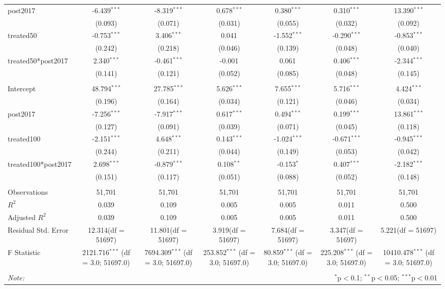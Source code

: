 \documentclass[12pt]{article}
\begin{document}
\begin{table}[!htbp]
\begin{tabular}{@{\extracolsep{5pt}}lcccccc}
 post2017 & -6.439$^{***}$ & -8.319$^{***}$ & 0.678$^{***}$ & 0.380$^{***}$ & 0.310$^{***}$ & 13.390$^{***}$ \\
  & (0.093) & (0.071) & (0.031) & (0.055) & (0.032) & (0.092) \\
 treated50 & -0.753$^{***}$ & 3.406$^{***}$ & 0.041$^{}$ & -1.552$^{***}$ & -0.290$^{***}$ & -0.853$^{***}$ \\
  & (0.242) & (0.218) & (0.046) & (0.139) & (0.048) & (0.040) \\
 treated50*post2017 & 2.340$^{***}$ & -0.461$^{***}$ & -0.001$^{}$ & 0.061$^{}$ & 0.406$^{***}$ & -2.344$^{***}$ \\
  & (0.141) & (0.121) & (0.052) & (0.085) & (0.048) & (0.145) \\
\hline \\[-1.8ex]
 Intercept & 48.794$^{***}$ & 27.785$^{***}$ & 5.626$^{***}$ & 7.655$^{***}$ & 5.716$^{***}$ & 4.424$^{***}$ \\
  & (0.196) & (0.164) & (0.034) & (0.121) & (0.046) & (0.034) \\
 post2017 & -7.256$^{***}$ & -7.917$^{***}$ & 0.617$^{***}$ & 0.494$^{***}$ & 0.199$^{***}$ & 13.861$^{***}$ \\
  & (0.127) & (0.091) & (0.039) & (0.071) & (0.045) & (0.118) \\
 treated100 & -2.151$^{***}$ & 4.648$^{***}$ & 0.143$^{***}$ & -1.024$^{***}$ & -0.671$^{***}$ & -0.945$^{***}$ \\
  & (0.244) & (0.211) & (0.044) & (0.149) & (0.053) & (0.042) \\
 treated100*post2017 & 2.698$^{***}$ & -0.879$^{***}$ & 0.108$^{**}$ & -0.153$^{*}$ & 0.407$^{***}$ & -2.182$^{***}$ \\
  & (0.151) & (0.117) & (0.051) & (0.088) & (0.052) & (0.148) \\
\hline \\[-1.8ex]
 Observations & 51,701 & 51,701 & 51,701 & 51,701 & 51,701 & 51,701 \\
 $R^2$ & 0.039 & 0.109 & 0.005 & 0.005 & 0.011 & 0.500 \\
 Adjusted $R^2$ & 0.039 & 0.109 & 0.005 & 0.005 & 0.011 & 0.500 \\
 Residual Std. Error & 12.314(df = 51697) & 11.801(df = 51697) & 3.919(df = 51697) & 7.684(df = 51697) & 3.347(df = 51697) & 5.221(df = 51697)  \\
 F Statistic & 2121.716$^{***}$ (df = 3.0; 51697.0) & 7694.309$^{***}$ (df = 3.0; 51697.0) & 253.852$^{***}$ (df = 3.0; 51697.0) & 80.859$^{***}$ (df = 3.0; 51697.0) & 225.208$^{***}$ (df = 3.0; 51697.0) & 10410.478$^{***}$ (df = 3.0; 51697.0) \\
\hline
\hline \\[-1.8ex]
\textit{Note:} & \multicolumn{6}{r}{$^{*}$p$<$0.1; $^{**}$p$<$0.05; $^{***}$p$<$0.01} \\
\end{tabular}
\end{table}
\end{document}
